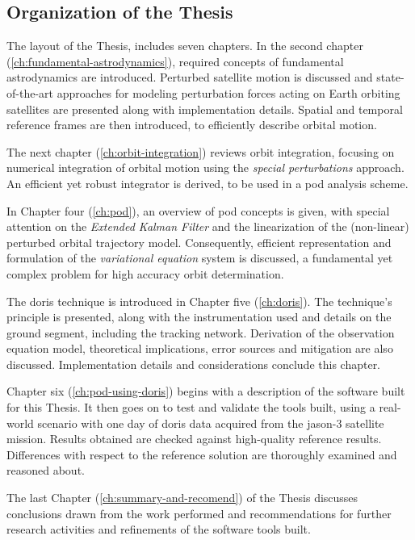 \subsection{Organization of the Thesis}\label{ssec:organization}
The layout of the Thesis, includes seven chapters. In the second chapter
(\autoref{ch:fundamental-astrodynamics}), required concepts of
fundamental astrodynamics are introduced. Perturbed satellite motion is discussed and
state-of-the-art approaches for modeling perturbation forces acting on Earth orbiting
satellites are presented along with implementation details. Spatial and temporal reference
frames are then introduced, to efficiently describe orbital motion.

The next chapter (\autoref{ch:orbit-integration}) reviews orbit integration, focusing on
numerical integration of orbital motion using the \emph{special perturbations}
approach. An efficient yet robust integrator is derived, to be used in a \gls{pod}
analysis scheme.

In Chapter four (\autoref{ch:pod}), an overview of \gls{pod} concepts is given,
with special attention on the \emph{Extended Kalman Filter} and the linearization
of the (non-linear) perturbed orbital trajectory model. Consequently, efficient
representation and formulation of the \emph{variational equation} system is discussed,
a fundamental yet complex problem for high accuracy orbit determination.

The \gls{doris} technique is introduced in Chapter five (\autoref{ch:doris}).
The technique's principle is presented, along with the instrumentation used and
details on the ground segment, including the tracking network. Derivation of the
observation equation model, theoretical implications, error sources and mitigation are
also discussed. Implementation details and considerations conclude this
chapter.

Chapter six (\autoref{ch:pod-using-doris}) begins with a description of the
software built for this Thesis. It then goes on to test and validate the tools built,
using a real-world scenario with one day of \gls{doris} data acquired from the
\gls{jason}-3 satellite mission. Results obtained are checked against high-quality
reference results. Differences with respect to the reference solution are thoroughly
examined and reasoned about.

The last Chapter (\autoref{ch:summary-and-recomend}) of the Thesis discusses
conclusions drawn from the work performed and recommendations for further research
activities and refinements of the software tools built.
